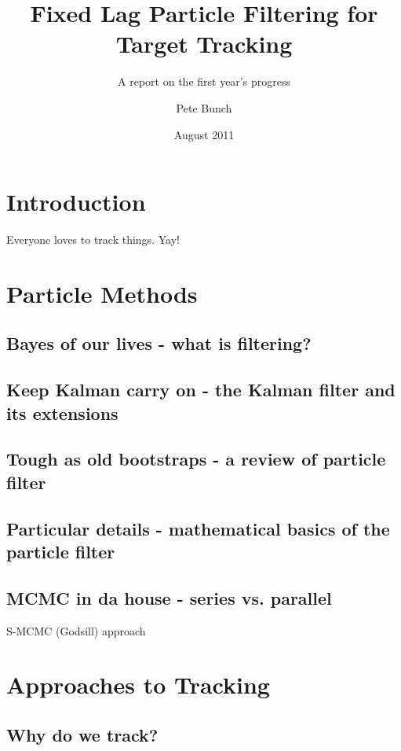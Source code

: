 \documentclass{RJWThesis}
\title{Fixed Lag Particle Filtering for Target Tracking}
\subtitle{A report on the first year's progress}
\author{Pete Bunch}
\date{August 2011}
\begin{document}
\maketitle
\tableofcontents


\chapter{Introduction}
Everyone loves to track things. Yay! 




\chapter{Particle Methods} \label{chap:basics}
\section{Bayes of our lives - what is filtering?}


\section{Keep Kalman carry on - the Kalman filter and its extensions}


\section{Tough as old bootstraps - a review of particle filter}


\section{Particular details - mathematical basics of the particle filter}


\section{MCMC in da house - series vs. parallel}
S-MCMC (Godsill) approach




\chapter{Approaches to Tracking}

\section{Why do we track?}

\end{document}
